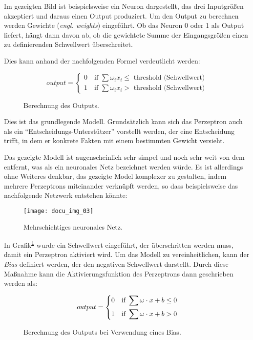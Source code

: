 Im gezeigten Bild ist beispielsweise ein Neuron dargestellt, das drei Inputgrößen akzeptiert und daraus einen Output
produziert. Um den Output zu berechnen werden Gewichte (\textit{engl. weights}) eingeführt. Ob das Neuron 0 oder 1 als
Output liefert, hängt dann davon ab, ob die gewichtete Summe der Eingangsgrößen einen zu definierenden Schwellwert
überschreitet.

Dies kann anhand der nachfolgenden Formel verdeutlicht werden:

\begin{figure}[h]
    \centering
    \[ output =
      \begin{cases}
        0 \quad \text{if } \sum \omega_i x_i \leqslant \text{ threshold (Schwellwert)}\\
        1 \quad \text{if } \sum \omega_i x_i > \text{ threshold (Schwellwert)}
      \end{cases}
    \]
    \caption{Berechnung des Outputs.}
    \label{fig:neuron-three-way}
\end{figure}


Dies ist das grundlegende Modell. Grundsätzlich kann sich das Perzeptron auch als ein ``Entscheidungs-Unterstützer''
vorstellt werden, der eine Entscheidung trifft, in dem er konkrete Fakten mit einem bestimmten Gewicht versieht.

Das gezeigte Modell ist augenscheinlich sehr simpel und noch sehr weit von dem entfernt, was als ein neuronales
Netz bezeichnet werden würde. Es ist allerdings ohne Weiteres denkbar, das gezeigte Model komplexer zu gestalten, indem
mehrere Perzeptrons miteinander verknüpft werden, so dass beispielsweise das nachfolgende Netzwerk entstehen könnte:

\begin{figure}[h]
    \centering
    \texttt{[image: docu\_img\_03]}
    \caption{Mehrschichtiges neuronales Netz.}
    \label{fig:multi-layer-net}
\end{figure}

In Grafik\textsuperscript{\ref{fig:neuron-three-way}} wurde ein Schwellwert eingeführt, der überschritten werden muss, damit ein Perzeptron
aktiviert wird. Um das Modell zu vereinheitlichen, kann der \textit{Bias} definiert werden, der den
negativen Schwellwert darstellt. Durch diese Maßnahme kann die Aktivierungsfunktion des Perzeptrons dann geschrieben
werden als:

\begin{figure}[h]
    \centering
    \[ output =
          \begin{dcases}
            0 \quad \text{if } \sum \omega \cdot x + b \leq 0 \\
            1 \quad \text{if } \sum \omega \cdot x + b > 0
          \end{dcases}
    \]
    \caption{Berechnung des Outputs bei Verwendung eines Bias.}
    \label{fig:bias-calculation}
\end{figure}

